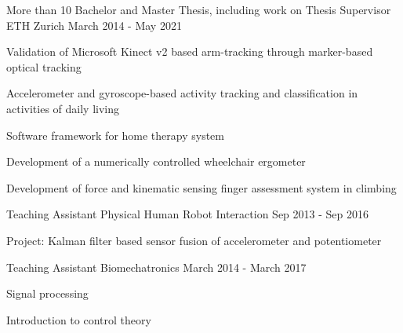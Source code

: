 

\begin{cventries}


     \cventry
    {More than 10 Bachelor and Master Thesis, including work on} %
    {Thesis Supervisor} %
    {ETH Zurich} %
    {March 2014 - May 2021} %
    {
      \begin{cvitems} %
      \item{Validation of Microsoft Kinect v2 based arm-tracking through marker-based optical tracking}
      \item{Accelerometer and gyroscope-based activity tracking and classification in activities of daily living}
      \item{Software framework for home therapy system}
      \item{Development of a numerically controlled wheelchair ergometer}
      \item{Development of force and kinematic sensing finger assessment system in climbing}
      \end{cvitems}
    }
  \cventry
    {Teaching Assistant} %
    {Physical Human Robot Interaction} %
    {} %
    {Sep 2013 - Sep 2016} %
    {
      \begin{cvitems} %
      \item{Project: Kalman filter based sensor fusion of accelerometer and potentiometer}
      \end{cvitems}
    }
    
  \cventry
    {Teaching Assistant} %
    {Biomechatronics} %
    {} %
    {March 2014 - March 2017} %
    {
      \begin{cvitems} %
      \item{Signal processing}
      \item{Introduction to control theory}
      \end{cvitems}
    }


\end{cventries}
